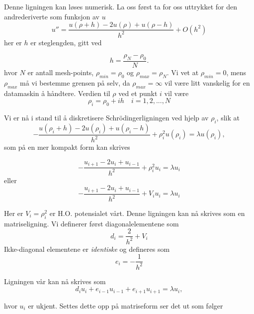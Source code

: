 \documentclass{article}
\begin{document}
Denne ligningen kan løses numerisk. La oss først ta for oss uttrykket for den andrederiverte som funksjon av $u$
\begin{equation}
    u''=\frac{u(\rho+h) -2u(\rho) +u(\rho-h)}{h^2} +O(h^2)
\end{equation}
her er $h$ er steglengden, gitt ved

\begin{equation}
  h=\frac{\rho_N-\rho_0 }{N}.
\end{equation}
hvor $N$ er antall mesh-points, $\rho_{min} = \rho_0$ og $\rho_{max} = \rho_N$. Vi vet at $\rho_{min} = 0$, mens $\rho_{max}$ må vi bestemme grensen på selv, da $\rho_{max} = \infty$ vil være litt vanskelig for en datamaskin å håndtere. Verdien til $\rho$ ved et punkt $i$ vil være
\[\rho_i = \rho_0 + ih \quad i = 1,2,...,N \]

Vi er nå i stand til å diskretisere Schrödingerligningen ved hjelp av $\rho_i$, slik at 
\[
-\frac{u(\rho_i+h) -2u(\rho_i) +u(\rho_i-h)}{h^2}+\rho_i^2u(\rho_i)  = \lambda u(\rho_i),
\]
som på en mer kompakt form kan skrives 

\[ -\frac{u_{i+1} -2u_i +u_{i-1}}{h^2}+\rho_i^2u_i= \lambda u_i \]
eller
\[-\frac{u_{i+1} -2u_i +u_{i-1} }{h^2}+V_iu_i  = \lambda u_i  \]

Her er $V_i = \rho_i^2$ er H.O. potensialet vårt. Denne ligningen kan nå skrives som en matriseligning. Vi definerer først diagonalelementene som 
\[ d_i = \frac{2}{h^2} + V_i \]
Ikke-diagonal elementene er \textit{identiske} og defineres som
\[e_i = -\frac{1}{h^2} \]

Ligningen vår kan nå skrives som 
\begin{equation}
d_iu_i+e_{i-1}u_{i-1}+e_{i+1}u_{i+1}  = \lambda u_i,
\end{equation}

hvor $u_i$ er ukjent. Settes dette opp på matriseform ser det ut som følger
\end{document}
